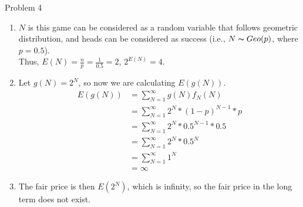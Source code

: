 \documentclass[12pt,letterpaper, onecolumn]{exam}
\begin{document}
\begin{questions}
    \question Problem 4
    \begin{solution}
        \begin{enumerate}
            \item $N$ is this game can be considered as a random variable that follows geometric distribution, and heads can be considered as success (i.e., $N \thicksim Geo(p)$, where $p = 0.5$). \\
        Thus, $E(N) = \frac{n}{p} = \frac{1}{0.5} = 2$, $2^{E(N)} = 4$. \\
            \item Let $g(N) = 2^N$, so now we are calculating $E(g(N))$. \\
            \begin{align*}
                E(g(N)) & = \sum_{N=1}^\infty g(N)f_N(N) \\
                & = \sum_{N=1}^\infty 2^N*(1-p)^{N-1}*p \\
                & = \sum_{N=1}^\infty 2^N*0.5^{N-1}*0.5 \\
                & = \sum_{N=1}^\infty 2^N*0.5^{N} \\
                & = \sum_{N=1}^\infty 1^N \\
                & = \infty
            \end{align*}
            \item The fair price is then $E(2^N)$, which is infinity, so the fair price in the long term does not exist.
        \end{enumerate}
        
    \end{solution}


\end{questions}
\end{document}

